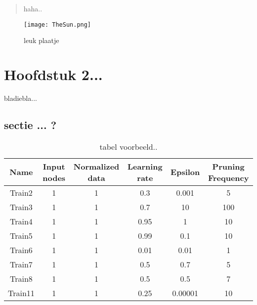 \documentclass[11pt,fleqn]{book} %
\begin{document}
\begin{quote}
haha..
\end{quote}

\begin{figure}[h]
    \centering
    \texttt{[image: TheSun.png]}
    \caption{leuk plaatje}
    \label{fig:pca}
\end{figure}




\chapter{Hoofdstuk 2...}

bladiebla...

\section{sectie ... ?}


\begin{table}[h!]
  \centering
    \begin{tabular}{ c c c c c c }
    \hline\hline
    
    Name & Input nodes & Normalized data & Learning rate & Epsilon & Pruning Frequency\\
    \hline
    
    Train2 & 1 & 1 & 0.3 & 0.001 & 5\\
    Train3 & 1 & 1 & 0.7 & 10 & 100\\
    Train4 & 1 & 1 & 0.95 & 1 & 10\\
    Train5 & 1 & 1 & 0.99 & 0.1 & 10\\
    Train6 & 1 & 1 & 0.01 & 0.01 & 1\\
    Train7 & 1 & 1 & 0.5 & 0.7 & 5\\
    Train8 & 1 & 1 & 0.5 & 0.5 & 7\\
    Train11 & 1 & 1 & 0.25 & 0.00001 & 10\\
    
    \hline
  \end{tabular}
  \caption{tabel voorbeeld..}
  \label{tab:ds9failed}
\end{table}

\cite{book_key}

\end{document}
